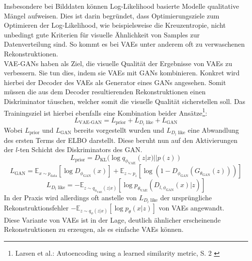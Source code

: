 Insbesondere bei Bilddaten können Log-Likelihood basierte Modelle qualitative Mängel aufweisen. Dies ist darin begründet, dass Optimierungsziele zum Optimieren der Log-Likelihood, wie beispielsweise die Kreuzentropie, nicht unbedingt gute Kriterien für visuelle Ähnlichkeit von Samples zur Datenverteilung sind. So kommt es bei \ac{VAE}s unter anderem oft zu verwaschenen Rekonstruktionen. \\
VAE-GANs haben als Ziel, die visuelle Qualität der Ergebnisse von \ac{VAE}s zu verbessern. Sie tun dies, indem sie \ac{VAE}s mit \ac{GAN}s kombinieren. Konkret wird hierbei der Decoder des \ac{VAE}s als Generator eines \ac{GAN}s angesehen. Somit müssen die aus dem Decoder resultierenden Rekonstruktionen einen Diskriminator täuschen, welcher somit die visuelle Qualität sicherstellen soll. Das Trainingsziel ist hierbei ebenfalls eine Kombination beider Ansätze\footnote{
    Larsen et al.: Autoencoding using a learned similarity metric, S. 2
    \cite{larsen2016autoencoding}
}:
\begin{equation}
    L_\text{VAE-GAN}
    =  L_\text{prior} +  L_{D_l\text{ like}} +  L_\text{GAN}
\end{equation}
Wobei $ L_\text{prior}$ und $ L_\text{GAN}$ bereits vorgestellt wurden und $ L_{D_l\text{ like}}$ eine Abwandlung des ersten Terms der \ac{ELBO} darstellt. Diese beruht nun auf den Aktivierungen der $l$-ten Schicht des Diskriminators des \ac{GAN}. 
\begin{equation}
    L_\text{prior} 
    = D_\text{KL} (\log q_{\phi_\text{VAE}}(z|x) || p(z))
\end{equation}
\begin{equation}
    L_\text{GAN} = \mathbb E_{x \sim p_\text{data}}[\log D_{\phi_\text{GAN}}(x)] 
    + \mathbb E_{z \sim p_z}
    [\log (1 - D_{\phi_\text{GAN}}(G_{\theta_\text{GAN}}(z)))]
\end{equation}
\begin{equation}
    L_{D_l\text{ like}} = 
    - \mathbb E_{z \sim q_{\phi_\text{VAE}}(z|x)}
    \left [
        \log p_{\theta_\text{VAE}}(D_{l, \phi_\text{GAN}}(x)|z)
    \right ]
\end{equation}
In der Praxis wird allerdings oft anstelle von $L_{D_l\text{ like}}$ der ursprüngliche Rekonstruktionsfehler $- \mathbb E_{z \sim q_{\phi}(z|x)}
    \left [
        \log p_\theta(x|z)
    \right ]$ von \ac{VAE}s angewandt. \\
Diese Variante von \ac{VAE}s ist in der Lage, deutlich ähnlicher erscheinende Rekonstruktionen zu erzeugen, als es einfache VAEs können.


